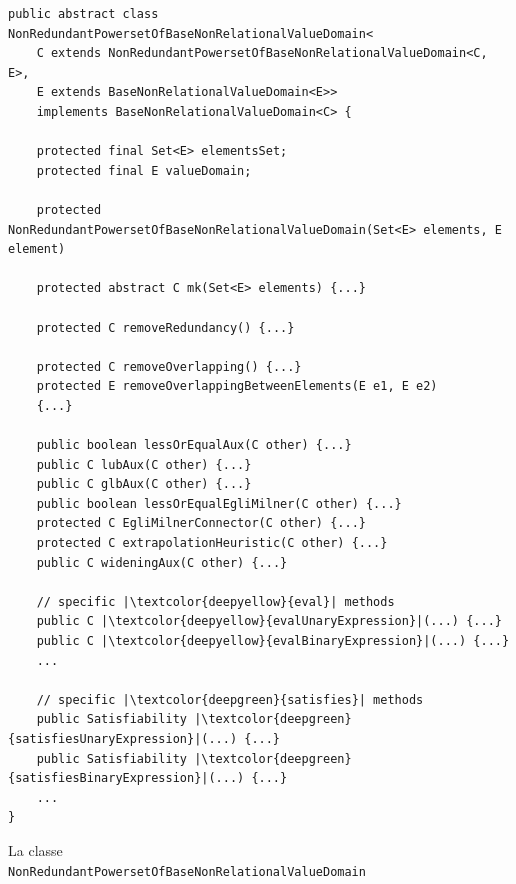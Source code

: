 \begin{algorithm}
\lstset{frame=none}
\begin{lstlisting}[belowskip=-1.1 \baselineskip, escapechar=|]
public abstract class NonRedundantPowersetOfBaseNonRelationalValueDomain<
    C extends NonRedundantPowersetOfBaseNonRelationalValueDomain<C, E>,
    E extends BaseNonRelationalValueDomain<E>> 
    implements BaseNonRelationalValueDomain<C> {
    
    protected final Set<E> elementsSet;
    protected final E valueDomain;
    
    protected NonRedundantPowersetOfBaseNonRelationalValueDomain(Set<E> elements, E element) 
    
    protected abstract C mk(Set<E> elements) {...}
    
    protected C removeRedundancy() {...}
    
    protected C removeOverlapping() {...}
    protected E removeOverlappingBetweenElements(E e1, E e2) 
    {...}
    
    public boolean lessOrEqualAux(C other) {...}
    public C lubAux(C other) {...}
    public C glbAux(C other) {...}
    public boolean lessOrEqualEgliMilner(C other) {...}
    protected C EgliMilnerConnector(C other) {...}
    protected C extrapolationHeuristic(C other) {...}
    public C wideningAux(C other) {...}   

    // specific |\textcolor{deepyellow}{eval}| methods
    public C |\textcolor{deepyellow}{evalUnaryExpression}|(...) {...}
    public C |\textcolor{deepyellow}{evalBinaryExpression}|(...) {...}
    ...

    // specific |\textcolor{deepgreen}{satisfies}| methods
    public Satisfiability |\textcolor{deepgreen}{satisfiesUnaryExpression}|(...) {...}
    public Satisfiability |\textcolor{deepgreen}{satisfiesBinaryExpression}|(...) {...}
    ...
}
\end{lstlisting}
\caption{La classe \\ \texttt{NonRedundantPowersetOfBaseNonRelationalValueDomain}}
\label{code:nonRedundantPowersetNonRelational}
\end{algorithm}

